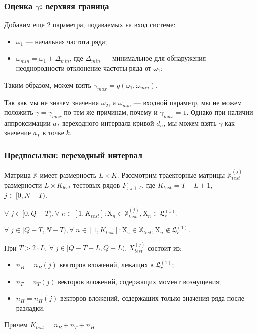 \documentclass[11pt]{beamer}
\begin{document}
	\begin{frame}
		\frametitle{Оценка $ \gamma $: верхняя граница}
		Добавим еще $ 2 $ параметра, подаваемых на вход системе:
		\begin{itemize}
			\item $ \omega_1 $ --- начальная частота ряда;
			\item $ \omega_{min} = \omega_1 + \Delta_{min} $, где $ \Delta_{min} $ --- минимальное для обнаружения неоднородности отклонение частоты ряда от $ \omega_1 $;
		\end{itemize}
		
		Таким образом, можем взять $ \gamma_{max} = g(\omega_1, \omega_{min}) $.
		
		\bigskip
		
		Так как мы не значем значения $ \omega_2 $, а $ \omega_{min} $ --- входной параметр, мы не можем положить $ \gamma = \gamma_{max} $ по тем же причинам, почему и $ \gamma_{max} = 1 $. Однако при наличии аппроксимации $ a_T $ переходного интервала кривой $ d_n $, мы можем взять $ \gamma $ как значение $ a_T $ в точке $ k $.
	\end{frame}
	

	\begin{frame}
		\frametitle{Предпосылки: переходный интервал}
		Матрица $ \mathbb{X} $ имеет размерность $ L \times K $. Рассмотрим траекторные матрицы $ \mathbb{X}_{test}^{(j)} $ размерности $ L \times K_{test} $ тестовых рядов $ F_{j, j+T} $, где $ K_{test} = T - L + 1 $, $ j \in [0, N-T) $. 
		
		$ \forall \; j \in [0, Q - T), \forall \; n \in [1, K_{test}]: \mathrm{X}_n \in \mathbb{X}_{test}^{(j)},  \mathrm{X}_n \in \mathfrak{L}_r^{(1)}$.
		
		$ \forall \; j \in [Q+T, N-T), \forall \; n \in [1, K_{test}]: \mathrm{X}_n \in \mathbb{X}_{test},  \mathrm{X}_n \notin \mathfrak{L}_r^{(1)} $. 
		
		\bigskip
		
		При $ T > 2 \cdot L $, $ \forall \; j \in [Q - T + L, Q - L)$, $ X_{test}^{(j)} $ состоит из:
		
		\begin{itemize}
			\item $ n_B = n_B(j) $ векторов вложений, лежащих в $ \mathfrak{L}_r^{(1)} $;
			\item $ n_T = n_T(j) $ векторов вложений, содержащих момент возмущения;
			\item $ n_H = n_H(j) $ векторов вложений, содержащих только значения ряда после разладки.
		\end{itemize}
		
		Причем $ K_{test} = n_B + n_T + n_H $
		
	\end{frame}
\end{document}
